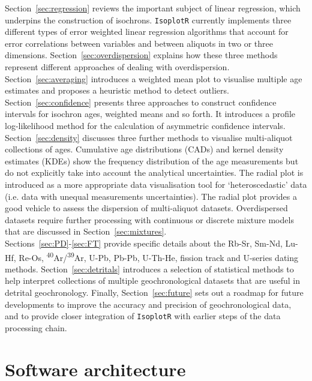 \documentclass{article}
\begin{document}
Section~\ref{sec:regression} reviews the important subject of linear
regression, which underpins the construction of
isochrons. \texttt{IsoplotR} currently implements three different
types of error weighted linear regression algorithms that account for
error correlations between variables and between aliquots in two or
three dimensions.  Section~\ref{sec:overdispersion} explains how these
three methods represent different approaches of dealing with
overdispersion.  Section~\ref{sec:averaging} introduces a weighted
mean plot to visualise multiple age estimates and proposes a heuristic
method to detect outliers.  Section~\ref{sec:confidence} presents
three approaches to construct confidence intervals for isochron ages,
weighted means and so forth.  It introduces a profile log-likelihood
method for the calculation of asymmetric confidence
intervals.\\

Section~\ref{sec:density} discusses three further methods to visualise
multi-aliquot collections of ages. Cumulative age distributions (CADs)
and kernel density estimates (KDEs) show the frequency distribution of
the age measurements but do not explicitly take into account the
analytical uncertainties. The radial plot is introduced as a more
appropriate data visualisation tool for `heteroscedastic' data
(i.e. data with unequal measurements uncertainties). The radial plot
provides a good vehicle to assess the dispersion of multi-aliquot
datasets. Overdispersed datasets require further processing with
continuous or discrete mixture models that are discussed in
Section~\ref{sec:mixtures}.\\

Sections~\ref{sec:PD}-\ref{sec:FT} provide
specific details about the Rb-Sr, Sm-Nd, Lu-Hf, Re-Os,
\textsuperscript{40}Ar/\textsuperscript{39}Ar, U-Pb, Pb-Pb, U-Th-He,
fission track and U-series dating methods. Section~\ref{sec:detritals}
introduces a selection of statistical methods to help interpret
collections of multiple geochronological datasets that are useful in
detrital geochronology. Finally, Section~\ref{sec:future} sets out a
roadmap for future developments to improve the accuracy and precision
of geochronological data, and to provide closer integration of
\texttt{IsoplotR} with earlier steps of the data processing chain.

\section{Software architecture}
\label{sec:architecture}
\end{document}

